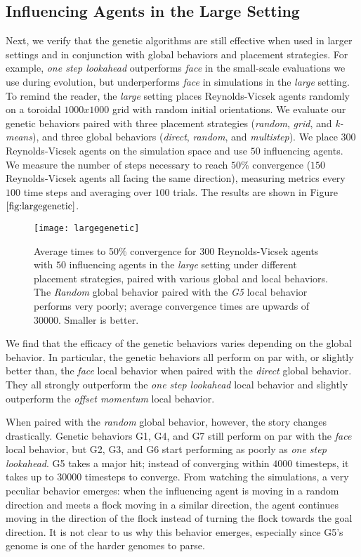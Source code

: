 \subsection{Influencing Agents in the Large Setting}
Next, we verify that the genetic algorithms are still effective when used in
larger settings and in conjunction with global behaviors and placement
strategies.
For example, \textit{one step lookahead} outperforms \textit{face} in the
small-scale evaluations we use during evolution, but underperforms \textit{face}
in simulations in the \textit{large} setting.
To remind the reader, the \textit{large} setting places Reynolds-Vicsek agents
randomly on a toroidal $1000x1000$ grid with random initial orientations.
We evaluate our genetic behaviors paired with three placement strategies
(\textit{random}, \textit{grid}, and \textit{k-means}), and three global
behaviors (\textit{direct}, \textit{random}, and \textit{multistep}).
We place $300$ Reynolds-Vicsek agents on the simulation space and use $50$
influencing agents.
We measure the number of steps necessary to reach $50\%$ convergence ($150$
Reynolds-Vicsek agents all facing the same direction), measuring metrics every
$100$ time steps and averaging over $100$ trials.
The results are shown in Figure $\ref{fig:largegenetic}$.

\begin{figure}
    \centering
    \texttt{[image: largegenetic]}
    \caption{Average times to 50\% convergence for $300$ Reynolds-Vicsek agents
    with $50$ influencing agents in the \textit{large} setting under different
    placement strategies, paired with various global and local behaviors.
    The \textit{Random} global behavior paired with the \textit{G5} local behavior
    performs very poorly; average convergence times are upwards of $30000$.
    Smaller is better.}
    \label{fig:largegenetic}
\end{figure}
We find that the efficacy of the genetic behaviors varies depending
on the global behavior.
In particular, the genetic behaviors all perform on par with, or slightly
better than, the \textit{face} local behavior when paired with the \textit{direct}
global behavior.
They all strongly outperform the \textit{one step lookahead} local behavior and
slightly outperform the \textit{offset momentum} local behavior.

When paired with the \textit{random} global behavior, however, the story changes
drastically.
Genetic behaviors G1, G4, and G7 still perform on par with the \textit{face} local
behavior, but G2, G3, and G6 start performing as poorly as \textit{one step
lookahead}.
G5 takes a major hit; instead of converging within $4000$ timesteps, it takes up to
$30000$ timesteps to converge.
From watching the simulations, a very peculiar behavior emerges: when the
influencing agent is moving in a random direction and meets a flock moving in a
similar direction, the agent continues moving in the direction of the flock
instead of turning the flock towards the goal direction.
It is not clear to us why this behavior emerges, especially since G5's genome
is one of the harder genomes to parse.

